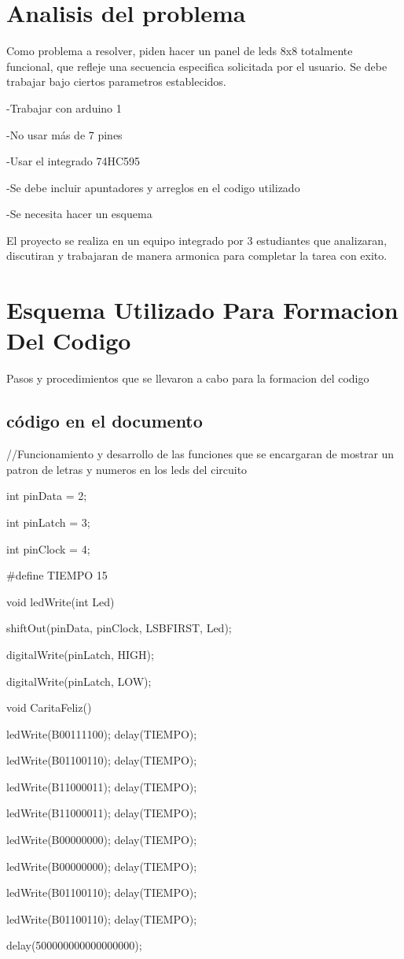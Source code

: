 \documentclass{article}
\begin{document}
\section{Analisis del problema} \label{contenido}
Como problema a resolver, piden hacer un panel de leds 8x8 totalmente funcional, que refleje una secuencia especifica solicitada por el usuario.
Se debe trabajar bajo ciertos parametros establecidos.

-Trabajar con arduino 1

-No usar más de 7 pines

-Usar el integrado 74HC595

-Se debe incluir apuntadores y arreglos en el codigo utilizado

-Se necesita hacer un esquema

El proyecto se realiza en un equipo integrado por 3 estudiantes que analizaran, discutiran y trabajaran de manera armonica para completar la tarea con exito.
\section{Esquema Utilizado Para Formacion Del Codigo}
Pasos y procedimientos que se llevaron a cabo para la formacion del codigo



\subsection{código en el documento}
//Funcionamiento y desarrollo de las funciones que se encargaran de mostrar un patron de letras y numeros en los leds del circuito 

int pinData  = 2;

int pinLatch = 3;

int pinClock = 4;

#define TIEMPO 15


void ledWrite(int Led){
   
   shiftOut(pinData, pinClock, LSBFIRST, Led);
   
   digitalWrite(pinLatch, HIGH);
   
   digitalWrite(pinLatch, LOW);
}
void CaritaFeliz(){
   
   ledWrite(B00111100); delay(TIEMPO);
   
   ledWrite(B01100110); delay(TIEMPO);
   
   ledWrite(B11000011); delay(TIEMPO);
   
   ledWrite(B11000011); delay(TIEMPO);
   
   ledWrite(B00000000); delay(TIEMPO);
   
   ledWrite(B00000000); delay(TIEMPO);
   
   ledWrite(B01100110); delay(TIEMPO);
   
   ledWrite(B01100110); delay(TIEMPO);
  
  delay(500000000000000000);}
\end{document}
